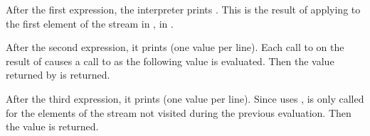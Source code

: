 \begin{exe}[3.51]
    After the first expression, the interpreter prints . This is the 
    result of applying  to the first element of the stream in 
    , in .

    After the second expression, it prints  (one value per 
    line). Each call to  on the result of  
    causes a call to  as the following value is evaluated. Then the 
    value returned by  is returned.

    After the third expression, it prints  (one value per line). 
    Since  uses ,  is only called for the 
    elements of the stream not visited during the previous evaluation. Then the 
    value  is returned.
\end{exe}

